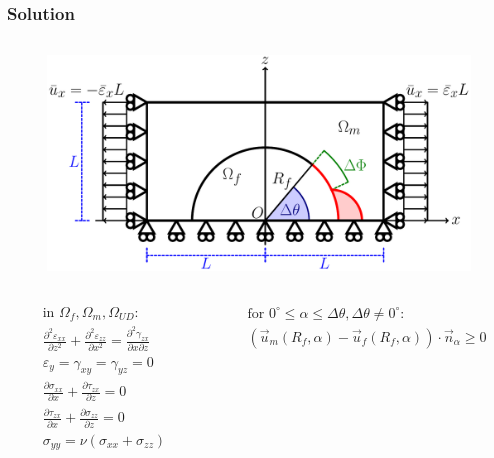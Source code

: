 \documentclass[first,firstsupp,lastsupp,last,hyperref,table]{ETHclass}
\begin{document}
\begin{frame}
\frametitle{\vspace{0.4cm}\small Solution}
\vspace{-1.1cm}
\centering
\begin{columns}
\begin{column}{0.6\textwidth}
\begin{figure}
\includegraphics[width=0.825\columnwidth]{RUC.pdf}
\end{figure}
\vspace{-1cm}
\begin{columns}
\begin{column}{0.3\columnwidth}
\tiny
\begin{equation*}
\begin{aligned}
&\text{in }\Omega_{f}, \Omega_{m}, \Omega_{UD}:\\
&\frac{\partial^{2}\varepsilon_{xx}}{\partial z^{2}}+\frac{\partial^{2}\varepsilon_{zz}}{\partial x^{2}}=\frac{\partial^{2}\gamma_{zx}}{\partial x\partial z}\\
&\varepsilon_{y}=\gamma_{xy}=\gamma_{yz}=0\\
&\frac{\partial\sigma_{xx}}{\partial x}+\frac{\partial\tau_{zx}}{\partial z} = 0\\
&\frac{\partial\tau_{zx}}{\partial x}+\frac{\partial\sigma_{zz}}{\partial z} = 0\\
&\sigma_{yy}=\nu\left(\sigma_{xx}+\sigma_{zz}\right)\\
\end{aligned}
\end{equation*}
\end{column}
\begin{column}{0.675\columnwidth}
\tiny
\begin{equation*}
\begin{aligned}
&\text{for } 0^{\circ}\leq\alpha\leq\Delta\theta, \Delta\theta\neq0^{\circ}:\\
&\left(\overrightarrow{u}_{m}\left(R_{f},\alpha\right)-\overrightarrow{u}_{f}\left(R_{f},\alpha\right)\right)\cdot\overrightarrow{n}_{\alpha}\geq 0\\

\end{aligned}
\end{equation*}
\end{column}
\end{columns}
\end{column}
\end{columns}
\end{frame}
\end{document}
